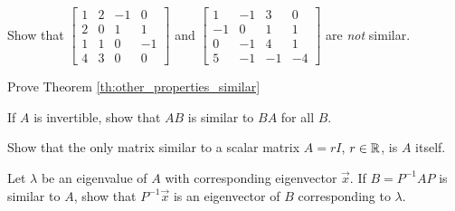 \documentclass{ximera}
\begin{document}





\begin{problem}\label{prob:notsimilar_4x4}
Show that $\begin{bmatrix}
1 & 2 & -1 &  0 \\
2 & 0 &  1 &  1 \\
1 & 1 &  0 & -1 \\
4 & 3 & 0 & 0
\end{bmatrix}$ and $
\begin{bmatrix}
  1 & -1 &  3 &  0 \\
 -1 &  0 &  1 &  1 \\
  0 & -1 &  4 &  1 \\
  5 & -1 & -1 & -4
\end{bmatrix}$ are \textit{not} similar.
\end{problem}

\begin{problem}\label{prob:similarproperties}
Prove Theorem \ref{th:other_properties_similar}
\end{problem}

\begin{problem}\label{prob:similarproperties_invertible}
If $A$ is invertible, show that $AB$ is similar to $BA$ for all $B$.
\end{problem}

\begin{problem}\label{prob:similarproperties_rI}
Show that the only matrix similar to a scalar matrix $A = rI$, $r\in\mathbb{R}$, is $A$ itself.
\end{problem}

\begin{problem}\label{prob:similarproperties_ev}
Let $\lambda$ be an eigenvalue of $A$ with corresponding eigenvector $\vec{x}$. If $B = P^{-1}AP$ is similar to $A$, show that $P^{-1}\vec{x}$ is an eigenvector of $B$ corresponding to $\lambda$.
\end{problem}
\end{document}
